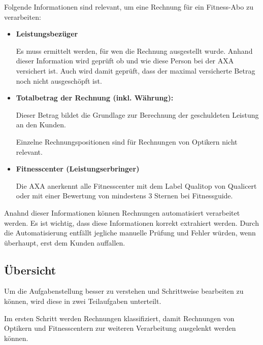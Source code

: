 Folgende Informationen sind relevant, um eine Rechnung für ein Fitness-Abo zu verarbeiten:

\begin{itemize}
    \item \textbf{Leistungsbezüger}
    
    Es muss ermittelt werden, für wen die Rechnung ausgestellt wurde. Anhand dieser Information wird geprüft ob und wie diese Person bei der AXA versichert ist. Auch wird damit geprüft, dass der maximal versicherte Betrag noch nicht ausgeschöpft ist.
    \item \textbf{Totalbetrag der Rechnung (inkl. Währung):}
    
    Dieser Betrag bildet die Grundlage zur Berechnung der geschuldeten Leistung an den Kunden. 
    
    Einzelne Rechnungspositionen sind für Rechnungen von Optikern nicht relevant.
    \item \textbf{Fitnesscenter (Leistungserbringer)}
    
    Die AXA anerkennt alle Fitnesscenter mit dem Label Qualitop von Qualicert oder mit einer Bewertung von mindestens 3 Sternen bei Fitnessguide.
\end{itemize}

Anahnd dieser Informationen können Rechnungen automatisiert verarbeitet werden. Es ist wichtig, dass diese Informationen korrekt extrahiert werden. Durch die Automatisierung entfällt jegliche manuelle Prüfung und Fehler würden, wenn überhaupt, erst dem Kunden auffallen. 


\subsection{Übersicht}


Um die Aufgabenstellung besser zu verstehen und Schrittweise bearbeiten zu können, wird diese in zwei Teilaufgaben unterteilt. 

Im ersten Schritt werden Rechnungen klassifiziert, damit Rechnungen von Optikern und Fitnesscentern zur weiteren Verarbeitung ausgelenkt werden können. 

